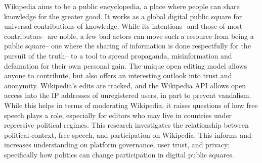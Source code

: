 
Wikipedia aims to be a public encyclopedia, a place where people can share knowledge for the greater good. It works as a global digital public square for universal contributions of knowledge. While its intentions- and those of most contributors– are noble, a few bad actors can move such a resource from being a public square– one where the sharing of information is done respectfully for the pursuit of the truth– to a tool to spread propaganda, misinformation and defamation for their own personal gain. The unique open editing model allows anyone to contribute, but also offers an interesting outlook into trust and anonymity. Wikipedia’s edits are tracked, and the Wikipedia API allows open access into the IP addresses of unregistered users, in part to prevent vandalism. While this helps in terms of moderating Wikipedia, it raises questions of how free speech plays a role, especially for editors who may live in countries under repressive political regimes. This research investigates the relationship between political context, free speech, and participation on Wikipedia. This informs and increases understanding on platform governance, user trust, and privacy; specifically how politics can change participation in digital public squares.


